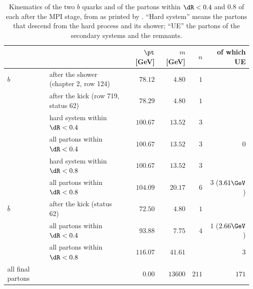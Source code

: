 \begin{table}[htbp]\centering\small
\caption[Kinematics of the two $b$ quarks and their cones after the MPI
stage]{Kinematics of the two $b$ quarks and of the partons within $\dR<0.4$
and $0.8$ of each after the MPI stage, from  as printed
by . ``Hard system'' means the
partons that descend from the hard process and its shower; ``UE'' the
partons of the secondary systems and the remnants.}
\label{tab:uninvited_cousins:kinematics}
\footnotesize
\begin{tabular}{llrrrr}\toprule
 & & $\pt$ [GeV] & $m$ [GeV] & $n$ & of which UE \\ \midrule
$b$ & after the shower (chapter 2, row 124) & $78.12$ & $4.80$ & $1$ & \\
    & after the kick (row 719, status 62) & $78.29$ & $4.80$ & $1$ & \\
    & hard system within $\dR<0.4$ & $100.67$ & $13.52$ & $3$ & \\
    & all partons within $\dR<0.4$ & $100.67$ & $13.52$ & $3$ & $0$ \\
    & hard system within $\dR<0.8$ & $100.67$ & $13.52$ & $3$ & \\
    & all partons within $\dR<0.8$ & $104.09$ & $20.17$ & $6$ & $3$ ($3.61\GeV$) \\ \midrule
$\bar b$ & after the kick (status 62) & $72.50$ & $4.80$ & $1$ & \\
    & all partons within $\dR<0.4$ & $93.88$ & $7.75$ & $4$ & $1$ ($2.66\GeV$) \\
    & all partons within $\dR<0.8$ & $116.07$ & $41.61$ & & $3$ \\ \midrule
all final partons & & $0.00$ & $13600$ & $211$ & $171$ \\
\bottomrule
\end{tabular}
\end{table}

